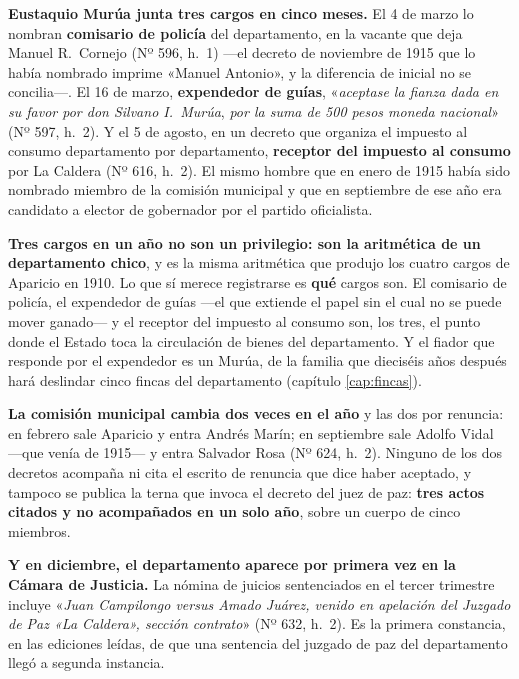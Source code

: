 \textbf{Eustaquio Murúa junta tres cargos en cinco meses.} El 4 de marzo lo
nombran \textbf{comisario de policía} del departamento, en la vacante que deja Manuel R.\ Cornejo
(Nº 596, h.\ 1) ---el decreto de noviembre de 1915 que lo había nombrado imprime «Manuel Antonio», y
la diferencia de inicial no se concilia---. El 16 de marzo, \textbf{expendedor de guías}, «\textit{aceptase la fianza dada en su
favor por don Silvano I.\ Murúa}, \textit{por la suma de 500 pesos
moneda nacional}» (Nº 597, h.\ 2). Y el 5 de agosto, en un decreto que organiza el impuesto al consumo
departamento por departamento, \textbf{receptor del impuesto al consumo} por La Caldera (Nº 616,
h.\ 2). El mismo hombre que en enero de 1915 había sido nombrado miembro de la comisión municipal y
que en septiembre de ese año era candidato a elector de gobernador por el partido oficialista.

\begin{cautela}
\textbf{Tres cargos en un año no son un privilegio: son la aritmética de un departamento chico}, y es
la misma aritmética que produjo los cuatro cargos de Aparicio en 1910. Lo que sí merece registrarse es
\textbf{qué} cargos son. El comisario de policía, el expendedor de guías ---el que extiende el papel
sin el cual no se puede mover ganado--- y el receptor del impuesto al consumo son, los tres, el punto
donde el Estado toca la circulación de bienes del departamento. Y el fiador que responde por el
expendedor es un Murúa, de la familia que dieciséis años después hará deslindar cinco fincas del
departamento (capítulo \ref{cap:fincas}).
\end{cautela}

\textbf{La comisión municipal cambia dos veces en el año} y las dos por renuncia: en febrero sale
Aparicio y entra Andrés Marín; en septiembre sale Adolfo Vidal ---que venía de 1915--- y entra
Salvador Rosa (Nº 624, h.\ 2). Ninguno de los dos decretos acompaña ni cita el escrito de renuncia que
dice haber aceptado, y tampoco se publica la terna que invoca el decreto del juez de paz:
\textbf{tres actos citados y no acompañados en un solo año}, sobre un cuerpo de cinco miembros.

\textbf{Y en diciembre, el departamento aparece por primera vez en la Cámara de Justicia.} La nómina
de juicios sentenciados en el tercer trimestre incluye «\textit{Juan Campilongo versus Amado Juárez,
venido en apelación del Juzgado de Paz «La Caldera», sección contrato}» (Nº 632, h.\ 2). Es la primera
constancia, en las ediciones leídas, de que una sentencia del juzgado de paz del departamento llegó a
segunda instancia.

